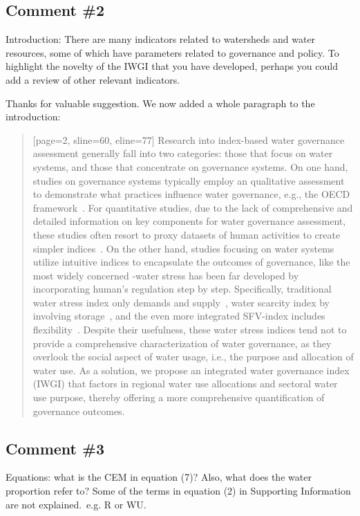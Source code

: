 \subsection{Comment \#2}\label{sec:2-2}
\RC{} Introduction: There are many indicators related to watersheds and water resources, some of which have parameters related to governance and policy. To highlight the novelty of the IWGI that you have developed, perhaps you could add a review of other relevant indicators.

\AR{} Thanks for valuable suggestion. We now added a whole paragraph to the introduction:

\begin{quote}[page=2, sline=60, eline=77]
    Research into index-based water governance assessment generally fall into two categories: those that focus on water systems, and those that concentrate on governance systems.
    On one hand, studies on governance systems typically employ an qualitative assessment to demonstrate what practices influence water governance, e.g., the OECD framework~\cite{oecd2018a}.
    For quantitative studies, due to the lack of comprehensive and detailed information on key components for water governance assessment, these studies often resort to proxy datasets of human activities to create simpler indices~\cite{varis2019,huggins2022a}.
    On the other hand, studies focusing on water systems utilize intuitive indices to encapsulate the outcomes of governance, like the most widely concerned -water stress has been far developed by incorporating human's regulation step by step.
    Specifically, traditional water stress index only demands and supply~\cite{gleick1996}, water scarcity index by involving storage~\cite{damkjaer2017}, and the even more integrated SFV-index includes flexibility~\cite{qin2019}.
    Despite their usefulness, these water stress indices tend not to provide a comprehensive characterization of water governance, as they overlook the social aspect of water usage, i.e., the purpose and allocation of water use.
    As a solution, we propose an integrated water governance index (IWGI) that factors in regional water use allocations and sectoral water use purpose, thereby offering a more comprehensive quantification of governance outcomes.
\end{quote}

\subsection{Comment \#3}
\RC{} Equations: what is the CEM in equation (7)? Also, what does the water proportion refer to? Some of the terms in equation (2) in Supporting Information are not explained.\ e.g. R or WU.\

